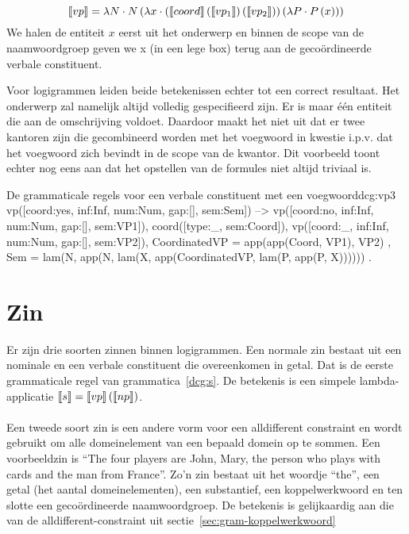 $$\llbracket vp\rrbracket = \lambda N \cdot N \left( \lambda x \cdot \left( \llbracket coord\rrbracket \left( \llbracket vp_1\rrbracket \right) \left( \llbracket vp_2\rrbracket \right) \right) \left( \lambda P \cdot P \left( x \right) \right) \right)$$ We halen de entiteit $x$ eerst uit het onderwerp en binnen de scope van de naamwoordgroep geven we x (in een lege box) terug aan de gecoördineerde verbale constituent.

Voor logigrammen leiden beide betekenissen echter tot een correct resultaat. Het onderwerp zal namelijk altijd volledig gespecifieerd zijn. Er is maar één entiteit die aan de omschrijving voldoet. Daardoor maakt het niet uit dat er twee kantoren zijn die gecombineerd worden met het voegwoord in kwestie i.p.v. dat het voegwoord zich bevindt in de scope van de kwantor. Dit voorbeeld toont echter nog eens aan dat het opstellen van de formules niet altijd triviaal is.

\begin{dcg}{De grammaticale regels voor een verbale constituent met een voegwoord}{dcg:vp3}
vp([coord:yes, inf:Inf, num:Num, gap:[], sem:Sem]) -->
  vp([coord:no, inf:Inf, num:Num, gap:[], sem:VP1]),
  coord([type:_, sem:Coord]),
  vp([coord:_, inf:Inf, num:Num, gap:[], sem:VP2]),
  { CoordinatedVP = app(app(Coord, VP1), VP2) },
  { Sem = lam(N, app(N, lam(X, app(CoordinatedVP, lam(P, app(P, X)))))) }.
\end{dcg}

\section{Zin}
Er zijn drie soorten zinnen binnen logigrammen. Een normale zin bestaat uit een nominale en een verbale constituent die overeenkomen in getal. Dat is de eerste grammaticale regel van grammatica~\ref{dcg:s}. De betekenis is een simpele lambda-applicatie $\llbracket s\rrbracket = \llbracket vp\rrbracket \left( \llbracket np\rrbracket \right)$.

\paragraph{} Een tweede soort zin is een andere vorm voor een alldifferent constraint en wordt gebruikt om alle domeinelement van een bepaald domein op te sommen. Een voorbeeldzin is ``The four players are John, Mary, the person who plays with cards and the man from France''. Zo'n zin bestaat uit het woordje ``the'', een getal (het aantal domeinelementen), een substantief, een koppelwerkwoord en ten slotte een gecoördineerde naamwoordgroep. De betekenis is gelijkaardig aan die van de alldifferent-constraint uit sectie~\ref{sec:gram-koppelwerkwoord}


